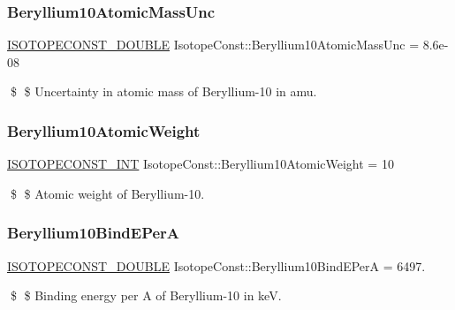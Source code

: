 \subsubsection{\texorpdfstring{Beryllium10\+Atomic\+Mass\+Unc}{Beryllium10AtomicMassUnc}}
{\footnotesize\ttfamily \mbox{\hyperlink{group___isotope_const-_macros_ga8f45a7272ce02c0b4c65c44636ed719a}{I\+S\+O\+T\+O\+P\+E\+C\+O\+N\+S\+T\+\_\+\+D\+O\+U\+B\+LE}} Isotope\+Const\+::\+Beryllium10\+Atomic\+Mass\+Unc = 8.\+6e-\/08}

\$ \$ Uncertainty in atomic mass of Beryllium-\/10 in amu. \mbox{\label{group___isotope_const-_beryllium-_be10_ga077f84f155ef6b9f4a49a0b0f7158984}} 
\subsubsection{\texorpdfstring{Beryllium10\+Atomic\+Weight}{Beryllium10AtomicWeight}}
{\footnotesize\ttfamily \mbox{\hyperlink{group___isotope_const-_macros_ga5f18360b3e99483a35c32d789e62621c}{I\+S\+O\+T\+O\+P\+E\+C\+O\+N\+S\+T\+\_\+\+I\+NT}} Isotope\+Const\+::\+Beryllium10\+Atomic\+Weight = 10}

\$ \$ Atomic weight of Beryllium-\/10. \mbox{\label{group___isotope_const-_beryllium-_be10_ga7636fbb5e250ccd1cac13480222866c1}} 
\subsubsection{\texorpdfstring{Beryllium10\+Bind\+E\+PerA}{Beryllium10BindEPerA}}
{\footnotesize\ttfamily \mbox{\hyperlink{group___isotope_const-_macros_ga8f45a7272ce02c0b4c65c44636ed719a}{I\+S\+O\+T\+O\+P\+E\+C\+O\+N\+S\+T\+\_\+\+D\+O\+U\+B\+LE}} Isotope\+Const\+::\+Beryllium10\+Bind\+E\+PerA = 6497.}

\$ \$ Binding energy per A of Beryllium-\/10 in keV. \mbox{\label{group___isotope_const-_beryllium-_be10_gae83a181eeb87d1f01d882fa57bdeeaff}} 
